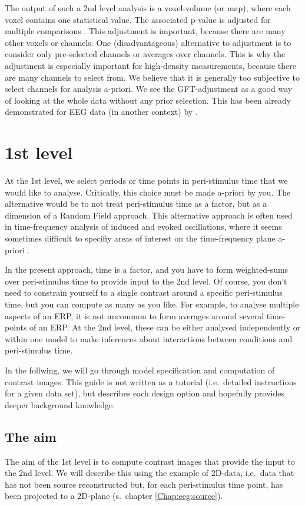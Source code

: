 The output of such a 2nd level analysis is a
voxel-volume (or map), where each voxel contains one statistical
value. The associated p-value is adjusted for multiple
comparisons \cite{kjw_hbf2}. This adjustment is important, because there are many
other voxels or channels. One (disadvantageous) alternative to
adjustment is to consider only pre-selected channels or averages over
channels. This is why the adjustment is especially important for
high-density measurements, because there are many channels to
select from. We believe that it is generally too subjective
to select channels for analysis a-priori. We see the
GFT-adjustment as a good way of looking at the whole data without any
prior selection. This has been already demonstrated for EEG data (in
another context) by \cite{james_rft}.

\section{1st level}
At the 1st level, we select periods or time points in
peri-stimulus time that we would like to analyse. Critically, this
choice must be made a-priori by you. The alternative would be to not
treat peri-stimulus time as a factor, but as a dimension of a Random
Field approach. This alternative approach is often used in
time-frequency analysis of induced and evoked oscillations, where it
seems sometimes difficult to specifiy areas of interest on the
time-frequency plane a-priori \cite{james_rft}. 

In the present approach, time is a factor, and
you have to form weighted-sums over peri-stimulus time to provide
input to the 2nd level. Of course, you don't need to constrain
yourself to a single contrast around a specific peri-stimulus time,
but you can compute as many as you like. For example, to analyse
multiple aspects of an ERP, it is not uncommon to form averages around
several time-points of an ERP. At the 2nd level, these can be either
analysed independently or within one model to make inferences about
interactions between conditions and peri-stimulus time.

In the follwing, we will go through model specification and
computation of contrast images. This guide is not written as a
tutorial (i.e.~detailed instructions for a given data set), but
describes each design option and hopefully provides deeper background
knowledge.

\subsection{The aim}
The aim of the 1st level is to compute contrast images that provide
the input to the 2nd level. We will describe this using the example of
2D-data, i.e.~data that has not been source reconstructed but, for
each peri-stimulus time point, has been projected to a 2D-plane
(s.~chapter \ref{Chap:eeg:source}).

